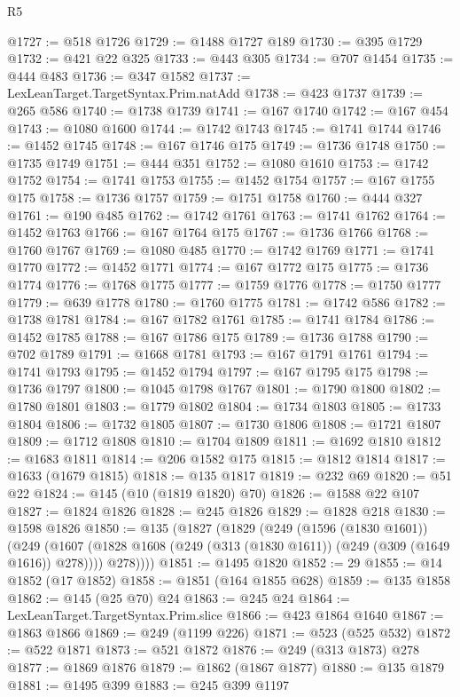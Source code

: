 \begin{lexlean}{R5}
\begin{coremodule}
{{{{{{{{{{{{{{{{{{{{{{{{{{{{{{{{{{{{{{{{{{{{{{{{{{{{{{{{{{{{{{@1727 := @518 @1726
@1729 := @1488 @1727 @189
@1730 := @395 @1729
@1732 := @421 @22 @325
@1733 := @443 @305
@1734 := @707 @1454
@1735 := @444 @483
@1736 := @347 @1582
@1737 := LexLeanTarget.TargetSyntax.Prim.natAdd
@1738 := @423 @1737
@1739 := @265 @586
@1740 := @1738 @1739
@1741 := @167 @1740
@1742 := @167 @454
@1743 := @1080 @1600
@1744 := @1742 @1743
@1745 := @1741 @1744
@1746 := @1452 @1745
@1748 := @167 @1746 @175
@1749 := @1736 @1748
@1750 := @1735 @1749
@1751 := @444 @351
@1752 := @1080 @1610
@1753 := @1742 @1752
@1754 := @1741 @1753
@1755 := @1452 @1754
@1757 := @167 @1755 @175
@1758 := @1736 @1757
@1759 := @1751 @1758
@1760 := @444 @327
@1761 := @190 @485
@1762 := @1742 @1761
@1763 := @1741 @1762
@1764 := @1452 @1763
@1766 := @167 @1764 @175
@1767 := @1736 @1766
@1768 := @1760 @1767
@1769 := @1080 @485
@1770 := @1742 @1769
@1771 := @1741 @1770
@1772 := @1452 @1771
@1774 := @167 @1772 @175
@1775 := @1736 @1774
@1776 := @1768 @1775
@1777 := @1759 @1776
@1778 := @1750 @1777
@1779 := @639 @1778
@1780 := @1760 @1775
@1781 := @1742 @586
@1782 := @1738 @1781
@1784 := @167 @1782 @1761
@1785 := @1741 @1784
@1786 := @1452 @1785
@1788 := @167 @1786 @175
@1789 := @1736 @1788
@1790 := @702 @1789
@1791 := @1668 @1781
@1793 := @167 @1791 @1761
@1794 := @1741 @1793
@1795 := @1452 @1794
@1797 := @167 @1795 @175
@1798 := @1736 @1797
@1800 := @1045 @1798 @1767
@1801 := @1790 @1800
@1802 := @1780 @1801
@1803 := @1779 @1802
@1804 := @1734 @1803
@1805 := @1733 @1804
@1806 := @1732 @1805
@1807 := @1730 @1806
@1808 := @1721 @1807
@1809 := @1712 @1808
@1810 := @1704 @1809
@1811 := @1692 @1810
@1812 := @1683 @1811
@1814 := @206 @1582 @175
@1815 := @1812 @1814
@1817 := @1633 (@1679 @1815)
@1818 := @135 @1817
@1819 := @232 @69
@1820 := @51 @22
@1824 := @145 (@10 (@1819 @1820) @70)
@1826 := @1588 @22 @107
@1827 := @1824 @1826
@1828 := @245 @1826
@1829 := @1828 @218
@1830 := @1598 @1826
@1850 := @135
    (@1827
      (@1829
        (@249
          (@1596 (@1830 @1601))
          (@249
            (@1607 (@1828 @1608 (@249 (@313 (@1830 @1611)) (@249 (@309 (@1649 @1616)) @278))))
            @278))))
@1851 := @1495 @1820
@1852 := 29
@1855 := @14 @1852 (@17 @1852)
@1858 := @1851 (@164 @1855 @628)
@1859 := @135 @1858
@1862 := @145 (@25 @70) @24
@1863 := @245 @24
@1864 := LexLeanTarget.TargetSyntax.Prim.slice
@1866 := @423 @1864 @1640
@1867 := @1863 @1866
@1869 := @249 (@1199 @226)
@1871 := @523 (@525 @532)
@1872 := @522 @1871
@1873 := @521 @1872
@1876 := @249 (@313 @1873) @278
@1877 := @1869 @1876
@1879 := @1862 (@1867 @1877)
@1880 := @135 @1879
@1881 := @1495 @399
@1883 := @245 @399 @1197
}}}}}}}}}}}}}}}}}}}}}}}}}}}}}}}}}}}}}}}}}}}}}}}}}}}}}}}}}}}}}}
\end{coremodule}
\end{lexlean}
